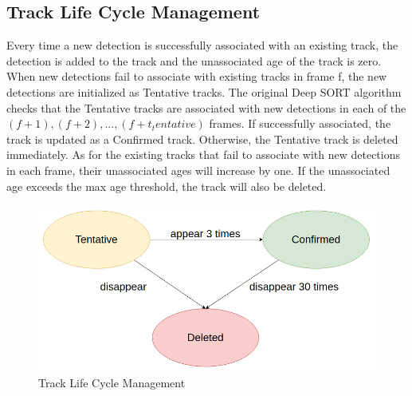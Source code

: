     \subsection{Track Life Cycle Management}
        Every time a new detection is successfully associated with an existing track, the detection is added to the track and the unassociated age of the track is zero. When new detections fail to associate with existing tracks in frame f, the new detections are initialized as Tentative tracks. The original Deep SORT algorithm checks that the Tentative tracks are 
        associated with new detections in each of the \emph{$(f + 1), (f + 2),...,(f + t_tentative)$} frames. If successfully associated, the track is updated as a Confirmed track. Otherwise, the Tentative track is deleted immediately. As for the existing tracks that fail to associate with new detections in each frame, their unassociated ages will increase by one. 
        If the unassociated age exceeds the max age threshold, the track will also be deleted.
        \begin{figure}[H]
            \centering
            \includegraphics[width=0.6\linewidth]{img/track-life.png}
            \caption{Track Life Cycle Management}
        \end{figure}
